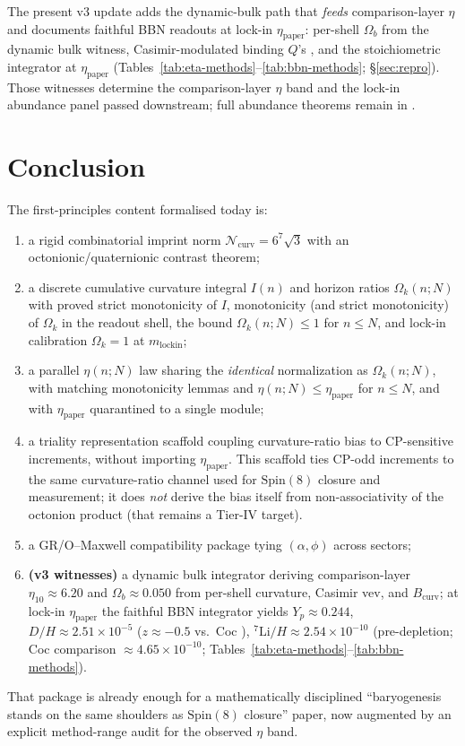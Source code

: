 \documentclass[11pt]{amsart}
\begin{document}
The present v3 update adds the dynamic-bulk path that \emph{feeds} comparison-layer
$\eta$ and documents faithful BBN readouts at lock-in
$\eta_{\mathrm{paper}}$: per-shell $\Omega_b$ from the dynamic bulk witness,
Casimir-modulated binding $Q$'s
\cite{hqiv-nucleon-binding-paper}, and the stoichiometric integrator at
$\eta_{\mathrm{paper}}$ (Tables~\ref{tab:eta-methods}--\ref{tab:bbn-methods};
\S\ref{sec:repro}).
Those witnesses determine the comparison-layer $\eta$ band and the lock-in
abundance panel passed downstream; full abundance theorems remain in
\cite{hqiv-bbn-paper}.

\section{Conclusion}

The first-principles content formalised today is:
\begin{enumerate}
\item a rigid combinatorial imprint norm \(\mathcal{N}_{\mathrm{curv}}=6^7\sqrt{3}\) with an octonionic/quaternionic contrast theorem;
\item a discrete cumulative curvature integral \(I(n)\) and horizon ratios \(\Omega_k(n;N)\) with proved strict monotonicity of \(I\), monotonicity (and strict monotonicity) of \(\Omega_k\) in the readout shell, the bound \(\Omega_k(n;N)\le 1\) for \(n\le N\), and lock-in calibration \(\Omega_k=1\) at \(m_{\mathrm{lockin}}\);
\item a parallel \(\eta(n;N)\) law sharing the \emph{identical} normalization as \(\Omega_k(n;N)\), with matching monotonicity lemmas and \(\eta(n;N)\le \eta_{\mathrm{paper}}\) for \(n\le N\), and with \(\eta_{\mathrm{paper}}\) quarantined to a single module;
\item a triality representation scaffold coupling curvature-ratio bias to CP-sensitive increments, without importing \(\eta_{\mathrm{paper}}\).
  This scaffold ties CP-odd increments to the same curvature-ratio channel used for \(\mathrm{Spin}(8)\) closure and measurement; it does \emph{not} derive the bias itself from non-associativity of the octonion product (that remains a Tier-IV target).
\item a GR/O--Maxwell compatibility package tying \((\alpha,\phi)\) across sectors;
\item \textbf{(v3 witnesses)} a dynamic bulk integrator deriving comparison-layer $\eta_{10}\approx 6.20$ and $\Omega_b\approx 0.050$ from per-shell curvature, Casimir vev, and $B_{\mathrm{curv}}$; at lock-in $\eta_{\mathrm{paper}}$ the faithful BBN integrator yields $Y_p\approx 0.244$, $D/H\approx 2.51\times 10^{-5}$ ($z\approx -0.5$ vs.\ Coc \cite{coc2015}), $^7\mathrm{Li}/H\approx 2.54\times 10^{-10}$ (pre-depletion; Coc comparison $\approx 4.65\times 10^{-10}$; Tables~\ref{tab:eta-methods}--\ref{tab:bbn-methods}).
\end{enumerate}
That package is already enough for a mathematically disciplined
``baryogenesis stands on the same shoulders as $\mathrm{Spin}(8)$
closure'' paper, now augmented by an explicit method-range audit for the
observed $\eta$ band.
\end{document}
